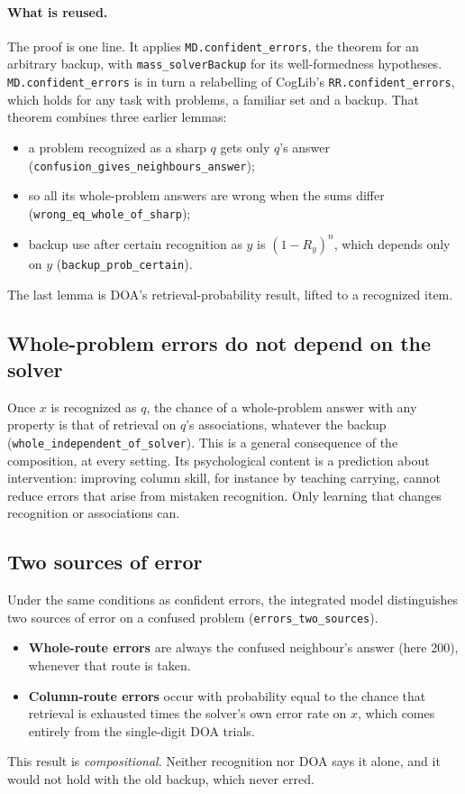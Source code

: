 \documentclass[11pt]{article}
\newcommand{\lean}[1]{\texttt{#1}}
\begin{document}
\paragraph{What is reused.} The proof is one line. It applies \lean{MD.confident\_errors}, the theorem for an arbitrary backup, with \lean{mass\_solverBackup} for its well-formedness hypotheses. \lean{MD.confident\_errors} is in turn a relabelling of CogLib's \lean{RR.confident\_errors}, which holds for any task with problems, a familiar set and a backup. That theorem combines three earlier lemmas:
\begin{itemize}
  \item a problem recognized as a sharp $q$ gets only $q$'s answer (\lean{confusion\_gives\_neighbours\_answer});
  \item so all its whole-problem answers are wrong when the sums differ (\lean{wrong\_eq\_whole\_of\_sharp});
  \item backup use after certain recognition as $y$ is $(1-R_y)^n$, which depends only on $y$ (\lean{backup\_prob\_certain}).
\end{itemize}
The last lemma is DOA's retrieval-probability result, lifted to a recognized item.

\subsection{Whole-problem errors do not depend on the solver}

Once $x$ is recognized as $q$, the chance of a whole-problem answer with any property is that of retrieval on $q$'s associations, whatever the backup (\lean{whole\_independent\_of\_solver}). This is a general consequence of the composition, at every setting. Its psychological content is a prediction about intervention: improving column skill, for instance by teaching carrying, cannot reduce errors that arise from mistaken recognition. Only learning that changes recognition or associations can.

\subsection{Two sources of error}

Under the same conditions as confident errors, the integrated model distinguishes two sources of error on a confused problem (\lean{errors\_two\_sources}).
\begin{itemize}
  \item \textbf{Whole-route errors} are always the confused neighbour's answer (here 200), whenever that route is taken.
  \item \textbf{Column-route errors} occur with probability equal to the chance that retrieval is exhausted times the solver's own error rate on $x$, which comes entirely from the single-digit DOA trials.
\end{itemize}
This result is \emph{compositional}. Neither recognition nor DOA says it alone, and it would not hold with the old backup, which never erred.
\end{document}
